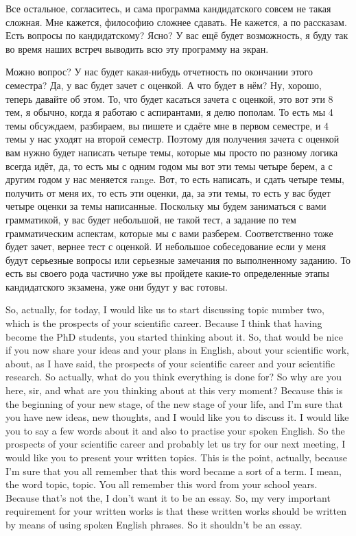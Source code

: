 \documentclass[main.tex]{subfiles}
\begin{document}
Все остальное, согласитесь, и сама программа кандидатского совсем не такая сложная.
Мне кажется, философию сложнее сдавать.
Не кажется, а по рассказам.
Есть вопросы по кандидатскому?
Ясно?
У вас ещё будет возможность, я буду так во время наших встреч выводить всю эту программу на экран.

Можно вопрос? У нас будет какая-нибудь отчетность по окончании этого семестра?
Да, у вас будет зачет с оценкой.
А что будет в нём?
Ну, хорошо, теперь давайте об этом.
То, что будет касаться зачета с оценкой, это вот эти 8 тем, я обычно, когда я работаю с аспирантами, я делю пополам.
То есть мы 4 темы обсуждаем, разбираем, вы пишете и сдаёте мне в первом семестре, и 4 темы у нас уходят на второй семестр.
Поэтому для получения зачета с оценкой вам нужно будет написать четыре темы, которые мы просто по разному логика всегда идёт, да, то есть мы с одним годом мы вот эти темы четыре берем, а с другим годом у нас меняется range.
Вот, то есть написать, и сдать четыре темы, получить от меня их, то есть эти оценки, да, за эти темы, то есть у вас будет четыре оценки за темы написанные.
Поскольку мы будем заниматься с вами грамматикой, у вас будет небольшой, не такой тест, а задание по тем грамматическим аспектам, которые мы с вами разберем.
Соответственно тоже будет зачет, вернее тест с оценкой.
И небольшое собеседование если у меня будут серьезные вопросы или серьезные замечания по выполненному заданию.
То есть вы своего рода частично уже вы пройдете какие-то определенные этапы кандидатского экзамена, уже они будут у вас готовы.

\newpage
{}

So, actually, for today, I would like us to start discussing topic number two, which is the prospects of your scientific career.
Because I think that having become the PhD students, you started thinking about it.
So, that would be nice if you now share your ideas and your plans in English, about your scientific work, about, as I have said, the prospects of your scientific career and your scientific research.
So actually, what do you think everything is done for?
So why are you here, sir, and what are you thinking about at this very moment?
Because this is the beginning of your new stage, of the new stage of your life, and I'm sure that you have new ideas, new thoughts, and I would like you to discuss it.
I would like you to say a few words about it and also to practise your spoken English.
So the prospects of your scientific career and probably let us try for our next meeting, I would like you to present your written topics.
This is the point, actually, because I'm sure that you all remember that this word became a sort of a term.
I mean, the word topic, topic.
You all remember this word from your school years.
Because that's not the, I don't want it to be an essay.
So, my very important requirement for your written works is that these written works should be written by means of using spoken English phrases.
So it shouldn't be an essay.
\end{document}
